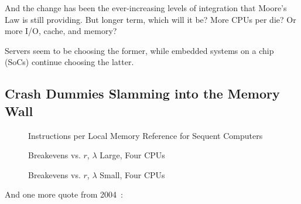 And the change has been the ever-increasing levels of integration
that Moore's Law is still providing.
But longer term, which will it be?
More CPUs per die?
Or more I/O, cache, and memory?

Servers seem to be choosing the former, while embedded systems on a chip
(SoCs) continue choosing the latter.

\subsection{Crash Dummies Slamming into the Memory Wall}
\label{sec:future:Crash Dummies Slamming into the Memory Wall}

\begin{figure}[tbp]
\begin{center}
\epsfxsize=3in
\end{center} %
\caption{Instructions per Local Memory Reference for Sequent Computers}
\label{fig:future:Instructions per Local Memory Reference for Sequent Computers}
\end{figure}

\begin{figure}[htbp]
\begin{center}
\epsfxsize=3in
\end{center} %
\caption{Breakevens vs. $r$, $\lambda$ Large, Four CPUs}
\label{fig:future:Breakevens vs. r, lambda Large, Four CPUs}
\end{figure}

\begin{figure}[htbp]
\begin{center}
\epsfxsize=3in
\end{center} %
\caption{Breakevens vs. $r$, $\lambda$ Small, Four CPUs}
\label{fig:future:Breakevens vs. r, Worst-Case lambda, Four CPUs}
\end{figure}

And one more quote from 2004~\cite{PaulEdwardMcKenneyPhD}:

